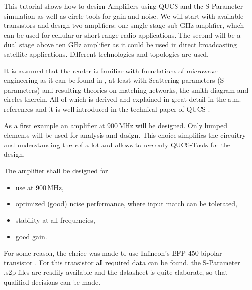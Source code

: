 \newcommand{\einh}[1]{\mathrm{#1}}

{}

This tutorial shows how to design Amplifiers using QUCS \cite{qucs}
and the S-Parameter simulation as well as circle tools for gain and
noise. We will start with available transistors and design two
amplifiers: one single stage sub-GHz amplifier, which can be used for
cellular or short range radio applications. The second will be a dual
stage above ten GHz amplifier as it could be used in direct
broadcasting satellite applications. Different technologies and
topologies are used.

It is assumed that the reader is familiar with foundations of
microwave engineering as it can be found in \cite{col91,poz05}, at
least with Scattering parameters (S-parameters) and resulting theories
on matching networks, the smith-diagram and circles therein. All of
which is derived and explained in great detail in the a.m. references
and it is well introduced in the technical paper of QUCS \cite{qucs}.


As a first example an amplifier at 900\,MHz will be designed. Only
lumped elements will be used for analysis and design. This choice
simplifies the circuitry and understanding thereof a lot and allows to
use only QUCS-Tools for the design.

The amplifier shall be designed for
\begin{itemize}
\item use at 900\,MHz,
\item optimized (good) noise performance, where input match can be tolerated,
\item stability at all frequencies,
\item good gain.
\end{itemize}



For some reason, the choice was made to use Infineon's BFP-450 bipolar
transistor \cite{infbfp450}. For this transistor all required data can
be found, the S-Parameter .s2p files are readily available and the
datasheet is quite elaborate, so that qualified decisions can be made.

